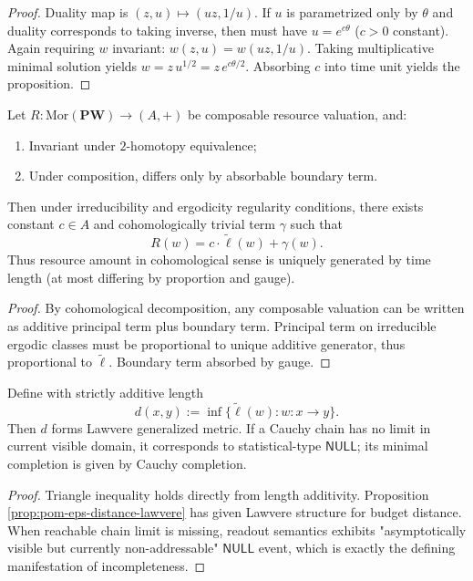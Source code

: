 \begin{proof}
Duality map is \((z,u)\mapsto(uz,1/u)\).
If \(u\) is parametrized only by \(\theta\) and duality corresponds to taking inverse, then must have \(u=e^{c\theta}\) (\(c>0\) constant).
Again requiring \(w\) invariant: \(w(z,u)=w(uz,1/u)\).
Taking multiplicative minimal solution yields \(w=z\,u^{1/2}=z\,e^{c\theta/2}\).
Absorbing \(c\) into time unit yields the proposition.
\end{proof}

\begin{theorem}\label{thm:xi-time-initial-generator-for-resources}
Let \(R:\mathrm{Mor}(\mathbf{PW})\to (A,+)\) be composable resource valuation, and:
\begin{enumerate}
  \item Invariant under \(2\)-homotopy equivalence;
  \item Under composition, differs only by absorbable boundary term.
\end{enumerate}
Then under irreducibility and ergodicity regularity conditions, there exists constant \(c\in A\) and cohomologically trivial term \(\gamma\) such that
\[
R(w)=c\cdot\widetilde\ell(w)+\gamma(w).
\]
Thus resource amount in cohomological sense is uniquely generated by time length (at most differing by proportion and gauge).
\end{theorem}

\begin{proof}
By cohomological decomposition, any composable valuation can be written as additive principal term plus boundary term.
Principal term on irreducible ergodic classes must be proportional to unique additive generator, thus proportional to \(\widetilde\ell\).
Boundary term absorbed by gauge.
\end{proof}

\begin{proposition}\label{prop:xi-time-lawvere-null-incompleteness}
Define with strictly additive length
\[
d(x,y):=\inf\{\widetilde\ell(w):w:x\to y\}.
\]
Then \(d\) forms Lawvere generalized metric.
If a Cauchy chain has no limit in current visible domain, it corresponds to statistical-type \(\mathsf{NULL}\);
its minimal completion is given by Cauchy completion.
\end{proposition}

\begin{proof}
Triangle inequality holds directly from length additivity.
Proposition \ref{prop:pom-eps-distance-lawvere} has given Lawvere structure for budget distance.
When reachable chain limit is missing, readout semantics exhibits "asymptotically visible but currently non-addressable" \(\mathsf{NULL}\) event, which is exactly the defining manifestation of incompleteness.
\end{proof}

